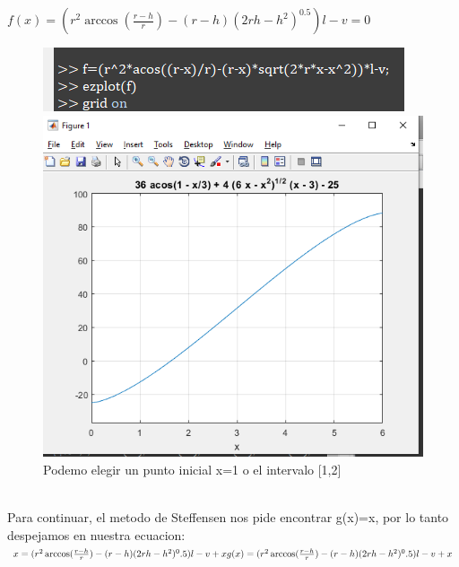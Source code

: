 \documentclass{article}
\theoremstyle{mytheoremstyle}
\theoremstyle{mytheoremstyle}
\theoremstyle{myproblemstyle}
\begin{document}
$f(x)=(r^2\arccos(\frac{r-h}{r})-(r-h)(2rh-h^2)^0.5)l-v=0$
\begin{figure}[ht]
    \includegraphics[scale=0.7]{img/stf2.png}
    \\ \includegraphics[scale=0.6]{img/stf3.png}{\\Podemo elegir un punto inicial x=1 o el intervalo [1,2]}
\end{figure}
\\Para continuar, el metodo de Steffensen nos pide encontrar g(x)=x, por lo tanto despejamos en nuestra ecuacion:
$x=(r^2\arccos(\frac{r-h}{r})-(r-h)(2rh-h^2)^0.5)l-v+x\\
g(x)=(r^2\arccos(\frac{r-h}{r})-(r-h)(2rh-h^2)^0.5)l-v+x
$
\end{document}
